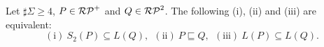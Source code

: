 \begin{thm}\label{Theorem21}%
    Let $\sharp\Sigma \geq 4$, $P \in \mathcal{RP}^{+}$ and $Q \in \mathcal{RP}^{2}$.
    The following (i), (ii) and (iii) are equivalent:
    \[
        \mathrm{(i)}\ S_{2}(P) \subseteq L(Q),\ \
        \mathrm{(ii)}\ P \sqsubseteq Q, \ \
        \mathrm{(iii)}\ L(P) \subseteq L(Q).
    \]
\end{thm}






